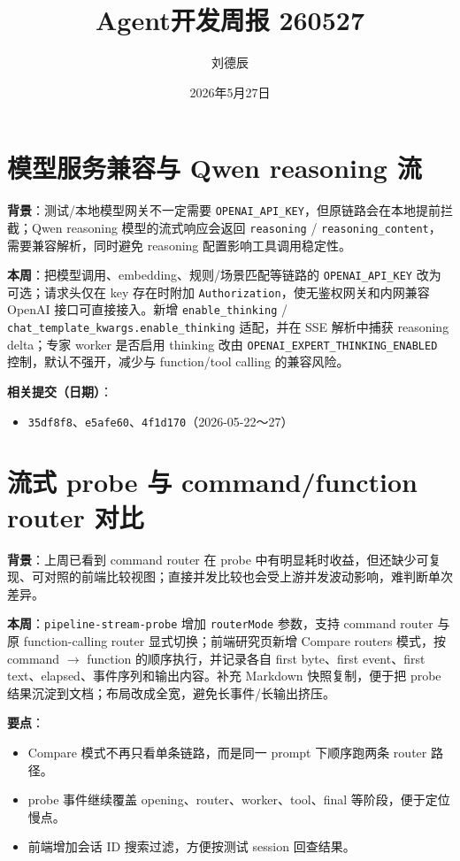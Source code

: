 \documentclass[UTF8]{ctexart}
\title{Agent开发周报 260527}
\author{刘德辰}
\date{2026年5月27日}
\begin{document}
\maketitle

\section{模型服务兼容与 Qwen reasoning 流}

\textbf{背景}：测试/本地模型网关不一定需要 \texttt{OPENAI\_API\_KEY}，但原链路会在本地提前拦截；Qwen reasoning 模型的流式响应会返回 \texttt{reasoning} / \texttt{reasoning\_content}，需要兼容解析，同时避免 reasoning 配置影响工具调用稳定性。

\textbf{本周}：把模型调用、embedding、规则/场景匹配等链路的 \texttt{OPENAI\_API\_KEY} 改为可选；请求头仅在 key 存在时附加 \texttt{Authorization}，使无鉴权网关和内网兼容 OpenAI 接口可直接接入。新增 \texttt{enable\_thinking} / \texttt{chat\_template\_kwargs.enable\_thinking} 适配，并在 SSE 解析中捕获 reasoning delta；专家 worker 是否启用 thinking 改由 \texttt{OPENAI\_EXPERT\_THINKING\_ENABLED} 控制，默认不强开，减少与 function/tool calling 的兼容风险。

\textbf{相关提交（日期）}：
\begin{itemize}
\item \texttt{35df8f8}、\texttt{e5afe60}、\texttt{4f1d170}（2026-05-22～27）
\end{itemize}

\section{流式 probe 与 command/function router 对比}

\textbf{背景}：上周已看到 command router 在 probe 中有明显耗时收益，但还缺少可复现、可对照的前端比较视图；直接并发比较也会受上游并发波动影响，难判断单次差异。

\textbf{本周}：\texttt{pipeline-stream-probe} 增加 \texttt{routerMode} 参数，支持 command router 与原 function-calling router 显式切换；前端研究页新增 Compare routers 模式，按 command $\rightarrow$ function 的顺序执行，并记录各自 first byte、first event、first text、elapsed、事件序列和输出内容。补充 Markdown 快照复制，便于把 probe 结果沉淀到文档；布局改成全宽，避免长事件/长输出挤压。

\textbf{要点}：
\begin{itemize}
\item Compare 模式不再只看单条链路，而是同一 prompt 下顺序跑两条 router 路径。
\item probe 事件继续覆盖 opening、router、worker、tool、final 等阶段，便于定位慢点。
\item 前端增加会话 ID 搜索过滤，方便按测试 session 回查结果。
\end{itemize}
\end{document}
